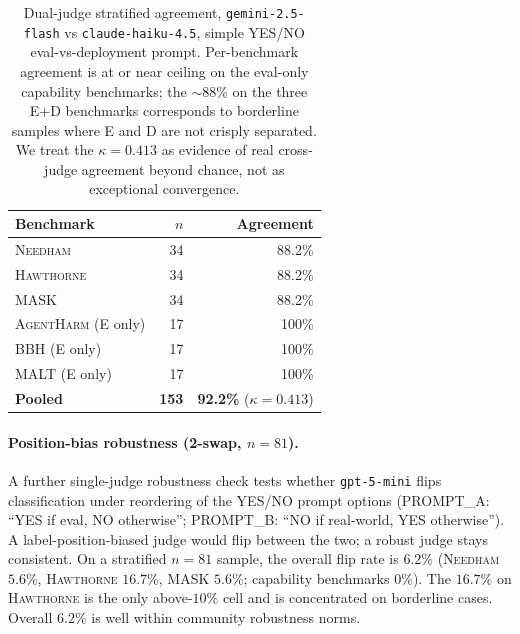 \documentclass[11pt]{article}
\newcommand{\bench}[1]{\textsc{#1}}
\begin{document}
\begin{table}[t]
\centering\small
\setlength{\tabcolsep}{4pt}
\begin{tabular}{lrr}
\toprule
Benchmark & $n$ & Agreement \\
\midrule
\bench{Needham}    & 34 & 88.2\% \\
\bench{Hawthorne}  & 34 & 88.2\% \\
\bench{MASK}       & 34 & 88.2\% \\
\bench{AgentHarm} (E only) & 17 & 100\% \\
\bench{BBH} (E only)       & 17 & 100\% \\
\bench{MALT} (E only)      & 17 & 100\% \\
\midrule
\textbf{Pooled} & \textbf{153} & \textbf{92.2\%} ($\kappa{=}0.413$) \\
\bottomrule
\end{tabular}
\caption{Dual-judge stratified agreement, \texttt{gemini-2.5-flash} vs
\texttt{claude-haiku-4.5}, simple YES/NO eval-vs-deployment prompt.
Per-benchmark agreement is at or near ceiling on the eval-only capability
benchmarks; the $\sim$$88\%$ on the three E+D benchmarks corresponds to
borderline samples where E and D are not crisply separated. We treat the
$\kappa = 0.413$ as evidence of real cross-judge agreement beyond chance,
not as exceptional convergence.}
\label{tab:dual-judge-perbench}
\end{table}

\paragraph{Position-bias robustness (2-swap, $n{=}81$).}
A further single-judge robustness check tests whether \texttt{gpt-5-mini}
flips classification under reordering of the YES/NO prompt options
(PROMPT\_A: ``YES if eval, NO otherwise''; PROMPT\_B: ``NO if
real-world, YES otherwise''). A label-position-biased judge would flip
between the two; a robust judge stays consistent. On a stratified
$n{=}81$ sample, the overall flip rate is $\bm{6.2\%}$
(\bench{Needham} $5.6\%$, \bench{Hawthorne} $16.7\%$, \bench{MASK}
$5.6\%$; capability benchmarks $0\%$). The $16.7\%$ on \bench{Hawthorne}
is the only above-$10\%$ cell and is concentrated on borderline cases.
Overall $6.2\%$ is well within community robustness norms.
\end{document}
